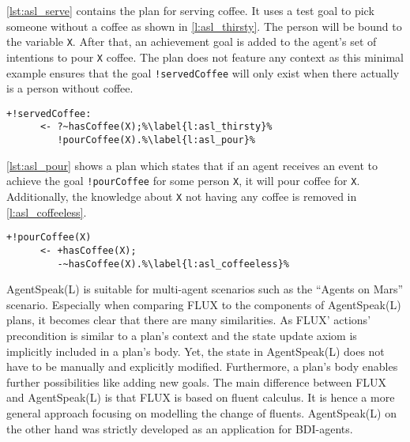\autoref{lst:asl_serve} contains the plan for serving coffee.
It uses a test goal to pick someone without a coffee as shown in \autoref{l:asl_thirsty}.
The person will be bound to the variable \texttt{X}.
After that, an achievement goal is added to the agent's set of intentions to pour \texttt{X} coffee.
The plan does not feature any context as this minimal example ensures that the goal \texttt{!servedCoffee} will only exist when there actually is a person without coffee.
\begin{lstlisting}[firstnumber=10, caption={Definition of the \texttt{servedCoffee} plan.}, label=lst:asl_serve]
  +!servedCoffee:
      <- ?~hasCoffee(X);%\label{l:asl_thirsty}%
         !pourCoffee(X).%\label{l:asl_pour}%
\end{lstlisting}
\autoref{lst:asl_pour} shows a plan which states that if an agent receives an event to achieve the goal \texttt{!pourCoffee} for some person \texttt{X}, it will pour coffee for \texttt{X}.
Additionally, the knowledge about \texttt{X} not having any coffee is removed in \autoref{l:asl_coffeeless}.
\begin{lstlisting}[firstnumber=14, caption={Definition of the \texttt{pourCoffee} plan.}, label=lst:asl_pour]
  +!pourCoffee(X)
      <- +hasCoffee(X);
         -~hasCoffee(X).%\label{l:asl_coffeeless}%
\end{lstlisting}

AgentSpeak(L) is suitable for multi-agent scenarios such as the \enquote{Agents on Mars} scenario.
Especially when comparing FLUX to the components of AgentSpeak(L) plans, it becomes clear that there are many similarities.
As FLUX' actions' precondition is similar to a plan's context and the state update axiom is implicitly included in a plan's body.
Yet, the state in AgentSpeak(L) does not have to be manually and explicitly modified.
Furthermore, a plan's body enables further possibilities like adding new goals.
The main difference between FLUX and AgentSpeak(L) is that FLUX is based on fluent calculus.
It is hence a more general approach focusing on modelling the change of fluents.
AgentSpeak(L) on the other hand was strictly developed as an application for BDI-agents.
